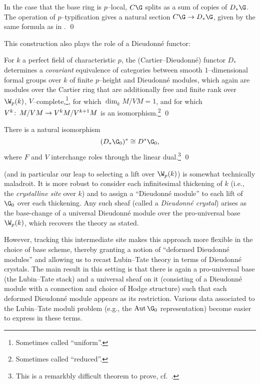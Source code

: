 \begin{lemma}
In the case that the base ring is \(p\)--local, \(C\G\) splits as a sum of copies of \(D_* \G\).  The operation of \(p\)--typification gives a natural section \(C\G \to D_* \G\), given by the same formula as in . \qed
\end{lemma}

This construction also plays the role of a Dieudonn\'e functor:

\begin{theorem}\label{CurveDieudonneTheorem}
For \(k\) a perfect field of characteristic \(p\), the (Cartier--Dieudonn\'e) functor \(D_*\) determines a \emph{covariant} equivalence of categories between smooth \(1\)--dimensional formal groups over \(k\) of finite \(p\)--height and Dieudonn\'e modules, which again are modules over the Cartier ring that are additionally free and finite rank over \(\W_p(k)\), \(V\)--complete,\footnote{Sometimes called ``uniform''.}, for which \(\dim_k M / VM = 1\), and for which \(V^k\colon\thinspace M / VM \to V^kM / V^{k+1}M\) is an isomorphism.\footnote{Sometimes called ``reduced''.} \qed
\end{theorem}

\begin{theorem}\label{DieudonneDualityThm}
There is a natural isomorphism \[(D_* \G_0)^* \cong D^* \G_0,\] where \(F\) and \(V\) interchange roles through the linear dual.\footnote{This is a remarkbly difficult theorem to prove, cf.\ .} \pushQED\qed\qedhere\popQED
\end{theorem}

\begin{remark}
 (and in particular our leap to selecting a lift over \(\W_p(k)\)) is somewhat technically maladroit.  It is more robust to consider each infinitesimal thickening of \(k\) (i.e., the \textit{crystalline site} over \(k\)) and to assign a ``Dieudonn\'e module'' to each lift of \(\G_0\) over each thickening.  Any such sheaf (called a \textit{Dieudonn\'e crystal}) arises as the base-change of a universal Dieudonn\'e module over the pro-universal base \(\W_p(k)\), which recovers the theory as stated.

However, tracking this intermediate site makes this approach more flexible in the choice of base scheme, thereby granting a notion of ``deformed Dieudonn\'e modules'' and allowing us to recast Lubin--Tate theory in terms of Dieudonn\'e crystals.  The main result in this setting is that there is again a pro-universal base (the Lubin--Tate stack) and a universal sheaf on it (consisting of a Dieudonn\'e module with a connection and choice of Hodge structure) such that each deformed Dieudonn\'e module appears as its restriction.  Various data associated to the Lubin--Tate moduli problem (e.g., the \(\Aut \G_0\) representation) become easier to express in these terms.
\end{remark}

